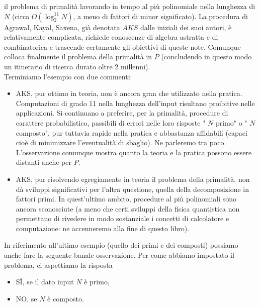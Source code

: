 \begin{enumerate}
          il problema di primalità lavorando in tempo al più polinomiale nella lunghezza
          di $N$ (circa $O\left(\log _2^{11} N\right)$, a meno di fattori di minor
          significato). La procedura di Agrawal, Kayal, Saxena, già denotata $A K S$
          dalle iniziali dei suoi autori, è relativamente complicata, richiede
          conoscenze di algebra astratta e di combinatorica e trascende certamente gli
          obiettivi di queste note. Comunque colloca finalmente il problema della
          primalità in $P$ (concludendo in questo modo un itinerario di ricerca durato
          oltre 2 millenni).\\
          Terminiamo l'esempio con due commenti:

          \begin{itemize}
              \item AKS, pur ottimo in teoria, non è ancora gran che utilizzato
                    nella pratica. Computazioni di grado 11 nella lunghezza dell'input
                    risultano proibitive
                    nelle applicazioni. Si continuano a preferire, per la primalità, procedure di carattere probabilistico, passibili di errori nelle loro risposte " $N$ primo" o " $N$ composto", pur tuttavia rapide nella pratica e abbastanza affidabili (capaci cioè di minimizzare l'eventualità di sbaglio). Ne parleremo tra poco. L'osservazione comunque mostra quanto la teoria e la pratica possono essere distanti anche per $P$.
              \item AKS, pur risolvendo egregiamente in teoria il problema della primalità,
                    non dà sviluppi significativi per l'altra questione, quella della
                    decomposizione in fattori primi. In quest'ultimo ambito, procedure
                    al più polinomiali sono ancora sconosciute (a meno che certi
                    sviluppi della fisica quantistica non permettano di rivedere in
                    modo sostanziale i concetti di calcolatore e computazione: ne
                    accenneremo alla fine di questo libro).
          \end{itemize}
\end{enumerate}

In riferimento all'ultimo esempio (quello dei primi e dei composti) possiamo
anche fare la seguente banale osservazione. Per come abbiamo impostato il
problema, ci aspettiamo la risposta

\begin{itemize}
    \item SÌ, se il dato input $N$ è primo,
    \item NO, se $N$ è composto.
\end{itemize}

